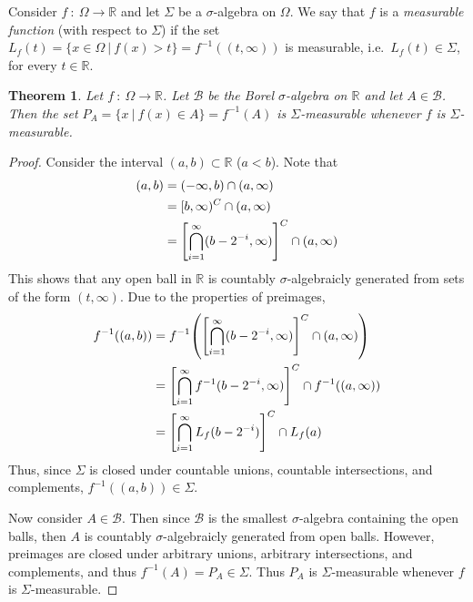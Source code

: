 \documentclass[12pt]{article}
\theoremstyle{plain}
\newtheorem{theorem}{Theorem}
\newenvironment{definition}[1][Definition]{\begin{trivlist}
\item[\hskip \labelsep {\bfseries #1}]}{\end{trivlist}}
\begin{document}
\begin{definition}
    Consider $f\ :\ \Omega \rightarrow \mathbb{R}$ and let $\Sigma$ be a $\sigma$-algebra on $\Omega$.  We say that $f$ is a \emph{measurable function} (with respect to $\Sigma$) if the set $L_f(t) = \{x \in \Omega\ |\ f(x) > t\} = f^{-1}((t, \infty))$ is measurable, i.e.~$L_f(t) \in \Sigma$, for every $t \in \mathbb{R}$.
\end{definition}
\begin{theorem}
    Let $f\ :\ \Omega \rightarrow \mathbb{R}$.  Let $\mathcal{B}$ be the Borel $\sigma$-algebra on $\mathbb{R}$ and let $A \in \mathcal{B}$.  Then the set $P_A = \{x\ |\ f(x) \in A\} = f^{-1}(A)$ is $\Sigma$-measurable whenever $f$ is $\Sigma$-measurable.
\end{theorem}
\begin{proof}
    Consider the interval $(a, b) \subset \mathbb{R}$ ($a < b$).  Note that
    \begin{align*}
        (a, b) &= (-\infty, b) \cap (a, \infty) \\
        &= [b, \infty)^C \cap (a, \infty) \\
        &= \qty[\bigcap_{i = 1}^\infty(b - 2^{-i}, \infty)]^C \cap (a, \infty)
    \end{align*}
    This shows that any open ball in $\mathbb{R}$ is countably $\sigma$-algebraicly generated from sets of the form $(t, \infty)$.  Due to the properties of preimages,
    \begin{align*}
        f^{-1}((a,b)) &= f^{-1}\qty(\qty[\bigcap_{i=1}^\infty (b - 2^{-i}, \infty)]^C \cap (a, \infty)) \\
        &= \qty[\bigcap_{i=1}^\infty f^{-1}(b - 2^{-i}, \infty)]^C \cap f^{-1}((a, \infty)) \\
        &= \qty[\bigcap_{i=1}^\infty L_f(b - 2^{-i})]^C \cap L_f(a)
    \end{align*}
    Thus, since $\Sigma$ is closed under countable unions, countable intersections, and complements, $f^{-1}((a,b)) \in \Sigma$.

    Now consider $A \in \mathcal{B}$.  Then since $\mathcal{B}$ is the smallest $\sigma$-algebra containing the open balls, then $A$ is countably $\sigma$-algebraicly generated from open balls.  However, preimages are closed under arbitrary unions, arbitrary intersections, and complements, and thus $f^{-1}(A) = P_A \in \Sigma$.  Thus $P_A$ is $\Sigma$-measurable whenever $f$ is $\Sigma$-measurable.
\end{proof}
\end{document}

